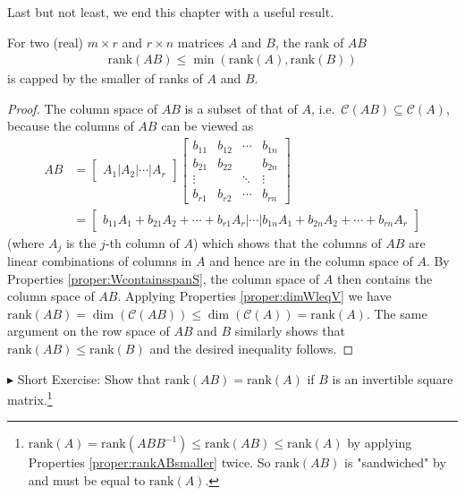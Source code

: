 Last but not least, we end this chapter with a useful result.
\begin{proper}
\label{proper:rankABsmaller}
For two (real) $m \times r$ and $r \times n$ matrices $A$ and $B$, the rank of $AB$
\begin{align}
\text{rank}(AB) \leq \min(\text{rank}(A),\text{rank}(B))
\end{align}
is capped by the smaller of ranks of $A$ and $B$.
\end{proper}
\begin{proof}
The column space of $AB$ is a subset of that of $A$, i.e.\ $\mathcal{C}(AB) \subseteq \mathcal{C}(A)$, because the columns of $AB$ can be viewed as
\begin{align*}
AB &= \begin{bmatrix}
A_1|A_2|\cdots|A_r
\end{bmatrix}
\begin{bmatrix}
b_{11} & b_{12} & \cdots & b_{1n} \\
b_{21} & b_{22} & & b_{2n} \\
\vdots & & \ddots & \vdots \\
b_{r1} & b_{r2} & \cdots & b_{rn}
\end{bmatrix} \\
&= \begin{bmatrix}
b_{11}A_1 + b_{21}A_2 + \cdots + b_{r1}A_r|\cdots|b_{1n}A_1 + b_{2n}A_2 + \cdots + b_{rn}A_r
\end{bmatrix}
\end{align*}
(where $A_j$ is the $j$-th column of $A$) which shows that the columns of $AB$ are linear combinations of columns in $A$ and hence are in the column space of $A$. By Properties \ref{proper:WcontainsspanS}, the column space of $A$ then contains the column space of $AB$. Applying Properties \ref{proper:dimWleqV} we have $\text{rank}(AB) = \dim(\mathcal{C}(AB)) \leq \dim(\mathcal{C}(A)) = \text{rank}(A)$. The same argument on the row space of $AB$ and $B$ similarly shows that $\text{rank}(AB) \leq \text{rank}(B)$ and the desired inequality follows.
\end{proof}
$\blacktriangleright$ Short Exercise: Show that $\text{rank}(AB) = \text{rank}(A)$ if $B$ is an invertible square matrix.\footnote{$\text{rank}(A) = \text{rank}(ABB^{-1}) \leq \text{rank}(AB) \leq \text{rank}(A)$ by applying Properties \ref{proper:rankABsmaller} twice. So $\text{rank}(AB)$ is "sandwiched" by and must be equal to $\text{rank}(A)$.}


